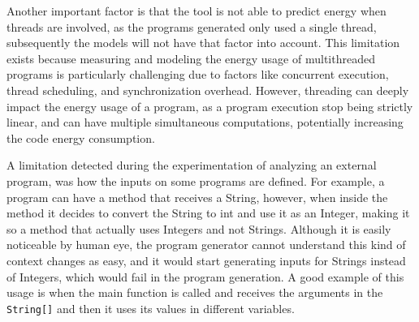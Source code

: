 Another important factor is that the tool is not able to predict energy when threads are involved, as the programs generated only used a single thread, subsequently the models will not have that factor into account. This limitation exists because measuring and modeling the energy usage of multithreaded programs is particularly challenging due to factors like concurrent execution, thread scheduling, and synchronization overhead. However, threading can deeply impact the energy usage of a program, as a program execution stop being strictly linear, and can have multiple simultaneous computations, potentially increasing the code energy consumption.

{\color{blue}
  A limitation detected during the experimentation of analyzing an external program, was how the inputs on some programs are defined. For example, a program can have a method that receives a String, however, when inside the method it decides to convert the String to int and use it as an Integer, making it so a method that actually uses Integers and not Strings. Although it is easily noticeable by human eye, the program generator cannot understand this kind of context changes as easy, and it would start generating inputs for Strings instead of Integers, which would fail in the program generation. A good example of this usage is when the main function is called and receives the arguments in the \texttt{String[]} and then it uses its values in different variables.
}




